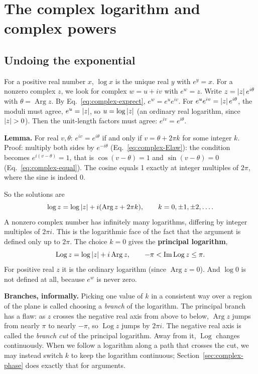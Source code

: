 \section{The complex logarithm and complex powers}\label{sec:complex-log}

\subsection{Undoing the exponential}

For a positive real number $x$, $\log x$ is the unique real $y$ with $e^y=x$. For a nonzero complex $z$, we look for complex $w=u+iv$ with $e^w=z$. Write $z=\left\lvert z\right\rvert e^{i\theta}$ with $\theta=\operatorname{Arg}z$. By Eq.~\eqref{eq:complex-exprect}, $e^w=e^ue^{iv}$. For $e^ue^{iv}=\left\lvert z\right\rvert e^{i\theta}$, the moduli must agree, $e^u=\left\lvert z\right\rvert$, so $u=\log\left\lvert z\right\rvert$ (an ordinary real logarithm, since $\left\lvert z\right\rvert>0$). Then the unit-length factors must agree: $e^{iv}=e^{i\theta}$.

\textbf{Lemma.} For real $v,\theta$: $e^{iv}=e^{i\theta}$ if and only if $v=\theta+2\pi k$ for some integer $k$.
Proof: multiply both sides by $e^{-i\theta}$ (Eq.~\eqref{eq:complex-Elaw}): the condition becomes $e^{i(v-\theta)}=1$, that is $\cos(v-\theta)=1$ and $\sin(v-\theta)=0$ (Eq.~\eqref{eq:complex-equal}). The cosine equals 1 exactly at integer multiples of $2\pi$, where the sine is indeed 0.

So the solutions are
\begin{equation}
\log z=\log\left\lvert z\right\rvert+i(\operatorname{Arg}z+2\pi k),\qquad k=0,\pm1,\pm2,\dots .\label{eq:complex-log}
\end{equation}
A nonzero complex number has infinitely many logarithms, differing by integer multiples of $2\pi i$. This is the logarithmic face of the fact that the argument is defined only up to $2\pi$. The choice $k=0$ gives the \textbf{principal logarithm},
\begin{equation}
\operatorname{Log}z=\log\left\lvert z\right\rvert+i\operatorname{Arg}z,\qquad -\pi<\operatorname{Im}\operatorname{Log}z\le\pi .\label{eq:complex-Log}
\end{equation}
For positive real $z$ it is the ordinary logarithm (since $\operatorname{Arg}z=0$). And $\log 0$ is not defined at all, because $e^w$ is never zero.

\textbf{Branches, informally.} Picking one value of $k$ in a consistent way over a region of the plane is called choosing a \emph{branch} of the logarithm. The principal branch has a flaw: as $z$ crosses the negative real axis from above to below, $\operatorname{Arg}z$ jumps from nearly $\pi$ to nearly $-\pi$, so $\operatorname{Log}z$ jumps by $2\pi i$. The negative real axis is called the \emph{branch cut} of the principal logarithm. Away from it, $\operatorname{Log}$ changes continuously. When we follow a logarithm along a path that crosses the cut, we may instead switch $k$ to keep the logarithm continuous; Section~\ref{sec:complex-phase} does exactly that for arguments.

